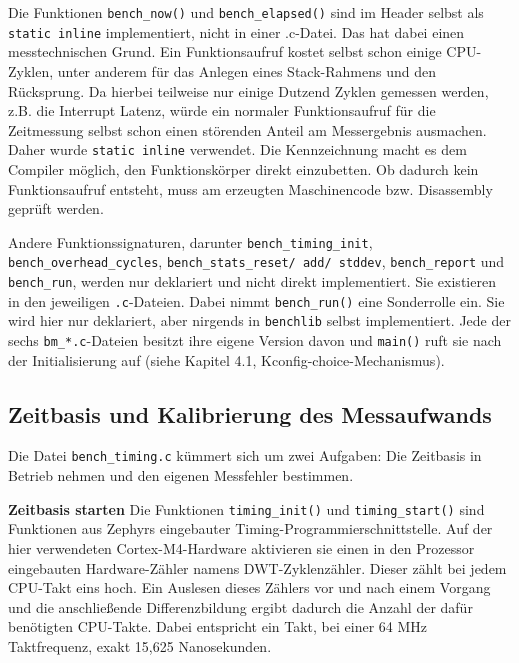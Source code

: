 Die Funktionen \lstinline[style=fileinline]|bench_now()| und \lstinline[style=fileinline]|bench_elapsed()| sind im Header selbst als \lstinline[style=fileinline]|static inline| implementiert, nicht in einer .c-Datei. Das hat dabei einen messtechnischen Grund. Ein Funktionsaufruf kostet selbst schon einige CPU-Zyklen, unter anderem f{\"u}r das Anlegen eines Stack-Rahmens und den R{\"u}cksprung. Da hierbei teilweise nur einige Dutzend Zyklen gemessen werden, z.B. die Interrupt Latenz, w{\"u}rde ein normaler Funktionsaufruf f{\"u}r die Zeitmessung selbst schon einen st{\"o}renden Anteil am Messergebnis ausmachen. Daher wurde \lstinline[style=fileinline]|static inline| verwendet. Die Kennzeichnung macht es dem Compiler m{\"o}glich, den Funktionsk{\"o}rper direkt einzubetten. Ob dadurch kein Funktionsaufruf entsteht, muss am erzeugten Maschinencode bzw. Disassembly gepr{\"u}ft werden.

Andere Funktionssignaturen, darunter \lstinline[style=fileinline]|bench_timing_init|, \lstinline[style=fileinline]|bench_overhead_cycles|, \lstinline[style=fileinline]|bench_stats_reset/ add/ stddev|, \lstinline[style=fileinline]|bench_report| und \lstinline[style=fileinline]|bench_run|, werden nur deklariert und nicht direkt implementiert. Sie existieren in den jeweiligen \lstinline[style=fileinline]|.c|-Dateien. Dabei nimmt \lstinline[style=fileinline]|bench_run()| eine Sonderrolle ein. Sie wird hier nur deklariert, aber nirgends in \lstinline[style=fileinline]|benchlib| selbst implementiert. Jede der sechs \lstinline[style=fileinline]|bm_*.c|-Dateien besitzt ihre eigene Version davon und \lstinline[style=fileinline]|main()| ruft sie nach der Initialisierung auf (siehe Kapitel 4.1, Kconfig-choice-Mechanismus).

\subsection{Zeitbasis und Kalibrierung des Messaufwands}
Die Datei \lstinline[style=fileinline]|bench_timing.c| k{\"u}mmert sich um zwei Aufgaben: Die Zeitbasis in Betrieb nehmen und den eigenen Messfehler bestimmen.

\textbf{Zeitbasis starten }Die Funktionen \lstinline[style=fileinline]|timing_init()| und \lstinline[style=fileinline]|timing_start()| sind Funktionen aus Zephyrs eingebauter Timing-Programmierschnittstelle. Auf der hier verwendeten Cortex-M4-Hardware aktivieren sie einen in den Prozessor eingebauten Hardware-Z{\"a}hler namens DWT-Zyklenz{\"a}hler. Dieser z{\"a}hlt bei jedem CPU-Takt eins hoch. Ein Auslesen dieses Z{\"a}hlers vor und nach einem Vorgang und die anschlie{\ss}ende Differenzbildung ergibt dadurch die Anzahl der daf{\"u}r ben{\"o}tigten CPU-Takte. Dabei entspricht ein Takt, bei einer 64 MHz Taktfrequenz, exakt 15,625 Nanosekunden.

